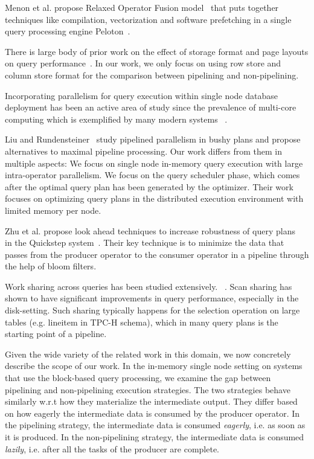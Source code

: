 Menon et al. propose Relaxed Operator Fusion model~\cite{rof} that puts together techniques like compilation, vectorization and software prefetching in a single query processing engine Peloton~\cite{pelotondb}. 

There is large body of prior work on the effect of storage format and page layouts on query performance~\cite{quickstep-storage, DBLP:journals/vldb/AilamakiDH02, DBLP:conf/vldb/HankinsP03, DBLP:journals/pvldb/GrundKPZCM10, DBLP:conf/sigmod/AbadiMH08}.
In our work, we only focus on using row store and column store format for the comparison between pipelining and non-pipelining. 

Incorporating parallelism for query execution within single node database deployment has been an active area of study since the prevalence of multi-core computing which is exemplified by many modern systems ~\cite{quickstep-system, morsel, vectorwise, hyrise-website}. 

Liu and Rundensteiner~\cite{DBLP:conf/vldb/LiuR05} study pipelined parallelism in bushy plans and propose alternatives to maximal pipeline processing. 
Our work differs from them in multiple aspects: We focus on single node in-memory query execution with large intra-operator parallelism. 
We focus on the query scheduler phase, which comes after the optimal query plan has been generated by the optimizer.
Their work focuses on optimizing query plans in the distributed execution environment with limited memory per node.

Zhu et al. propose look ahead techniques to increase robustness of query plans~\cite{DBLP:journals/pvldb/ZhuPSP17} in the Quickstep system~\cite{quickstep-system}.
Their key technique is to minimize the data that passes from the producer operator to the consumer operator in a pipeline through the help of bloom filters.

Work sharing across queries has been studied extensively. ~\cite{DBLP:conf/sigmod/HarizopoulosSA05, DBLP:conf/vldb/ZukowskiHNB07}.
Scan sharing has shown to have significant improvements in query performance, especially in the disk-setting.
Such sharing typically happens for the selection operation on large tables (e.g. lineitem in TPC-H schema), which in many query plans is the starting point of a pipeline. 

Given the wide variety of the related work in this domain, we now concretely describe the scope of our work.
In the in-memory single node setting on systems that use the block-based query processing, we examine the gap between pipelining and non-pipelining execution strategies. 
The two strategies behave similarly w.r.t how they materialize the intermediate output.
They differ based on how eagerly the intermediate data is consumed by the producer operator. 
In the pipelining strategy, the intermediate data is consumed \textit{eagerly}, i.e. as soon as it is produced.
In the non-pipelining strategy, the intermediate data is consumed \textit{lazily}, i.e. after all the tasks of the producer are complete.

